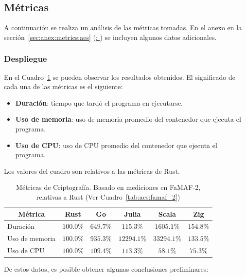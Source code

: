 \documentclass[11pt]{article}
\let\Oldsubsection\subsection
\renewcommand{\subsection}{\FloatBarrier\Oldsubsection}
\let\Oldsubsubsection\subsubsection
\renewcommand{\subsubsection}{\FloatBarrier\Oldsubsubsection}
\begin{document}
\newpage

\subsection{Métricas}

A continuación se realiza un análisis de las métricas tomadas. En el anexo en la sección~\ref{sec:anex:metrics:aes} (\hyperref[sec:anex:metrics:aes]{: }) se incluyen algunos datos adicionales.

\subsubsection{Despliegue}

En el Cuadro~\ref{tab:aes:metrics} se pueden observar los resultados obtenidos. El significado de cada una de las métricas es el siguiente:

\begin{itemize}
    \item \textbf{Duración}: tiempo que tardó el programa en ejecutarse.
    \item \textbf{Uso de memoria}: uso de memoria promedio del contenedor que ejecuta el programa.
    \item \textbf{Uso de CPU}: uso de CPU promedio del contenedor que ejecuta el programa.
\end{itemize}

Los valores del cuadro son relativos a las métricas de Rust.

\begin{table}[h]
\centering
\begin{tabular}{|l|c|c|c|c|c|}
\hline
\multicolumn{1}{|c|}{Métrica} & Rust & Go & Julia & Scala & Zig \\ \hline
Duración & $100.0\%$& $649.7\%$& $115.3\%$& $1605.1\%$& $154.8\%$\\ \hline
Uso de memoria & $100.0\%$& $935.3\%$& $12294.1\%$& $33294.1\%$& $133.5\%$\\ \hline
Uso de CPU & $100.0\%$& $109.4\%$& $113.3\%$& $58.1\%$& $75.3\%$\\ \hline
\end{tabular}
\caption{Métricas de Criptografía. Basado en mediciones en FaMAF-2, relativas a Rust  (Ver Cuadro~\ref{tab:aes:famaf_2})}
\label{tab:aes:metrics}
\end{table}

De estos datos, es posible obtener algunas conclusiones preliminares:
\end{document}
